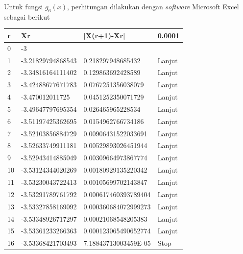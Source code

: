 \documentclass[12pt]{article}
\begin{document}
\begin{enumerate}
{\begin{enumerate}
{                Untuk fungsi $ g_6(x) $, perhitungan dilakukan dengan \emph{software} Microsoft Excel sebagai berikut
                \begin{longtable}[c]{|l|l|l|l|}
                    \hline
                    r  & Xr                & |X(r+1)-Xr|          & 0.0001 \\ \hline
                    \endfirsthead
                    \endhead
                    0  & -3                &                      &        \\ \hline
                    1  & -3.21829794868543 & 0.218297948685432    & Lanjut \\ \hline
                    2  & -3.34816164111402 & 0.129863692428589    & Lanjut \\ \hline
                    3  & -3.42488677671783 & 0.0767251356038079   & Lanjut \\ \hline
                    4  & -3.470012011725   & 0.0451252350071729   & Lanjut \\ \hline
                    5  & -3.49647797695354 & 0.026465965228534    & Lanjut \\ \hline
                    6  & -3.51197425362695 & 0.0154962766734186   & Lanjut \\ \hline
                    7  & -3.52103856884729 & 0.00906431522033691  & Lanjut \\ \hline
                    8  & -3.52633749911181 & 0.00529893026451944  & Lanjut \\ \hline
                    9  & -3.52943414885049 & 0.00309664973867774  & Lanjut \\ \hline
                    10 & -3.53124344020269 & 0.00180929135220342  & Lanjut \\ \hline
                    11 & -3.53230043722413 & 0.00105699702143847  & Lanjut \\ \hline
                    12 & -3.53291789761792 & 0.000617460393789404 & Lanjut \\ \hline
                    13 & -3.53327858169092 & 0.000360684072999273 & Lanjut \\ \hline
                    14 & -3.53348926717297 & 0.00021068548205383  & Lanjut \\ \hline
                    15 & -3.53361233266363 & 0.000123065490652774 & Lanjut \\ \hline
                    16 & -3.53368421703493 & 7.18843713003459E-05 & Stop   \\ \hline
                \end{longtable}
}
\end{enumerate}}
\end{enumerate}
\end{document}

